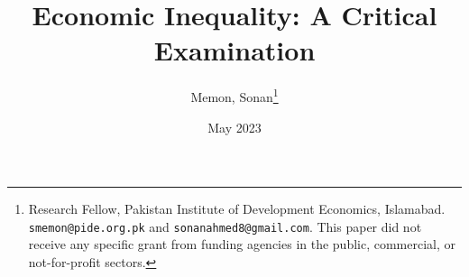 \documentclass[12pt]{article}
\newcommand{\1}{\mathbbm 1}
\begin{document}
	
	
	
	
	
	
	\title{{Economic Inequality: A Critical Examination %
			}}
			
			\date{May 2023%
		}
		
		
		\author{Memon, Sonan\footnote{Research Fellow, Pakistan Institute of Development Economics, Islamabad. \texttt{smemon@pide.org.pk} and \texttt{sonanahmed8@gmail.com}. This paper did not receive any specific grant from funding agencies in the public, commercial, or not-for-profit sectors.}} 
		
		\maketitle
		
		\vspace{-2ex}
		
\end{document}
